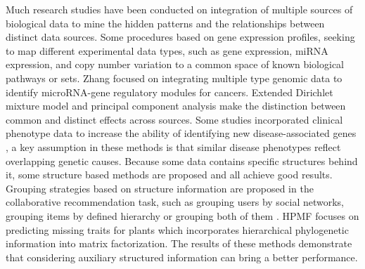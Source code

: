 \documentclass{bmcart}
\begin{document}
Much research studies have been conducted on integration of multiple sources of biological data to mine the hidden patterns and the relationships between distinct data sources. Some procedures based on gene expression profiles, seeking to map different experimental data types, such as gene expression, miRNA expression, and copy number variation to a common space of known biological pathways or sets\cite{Khatri2012,Mitrea2013}. Zhang\cite{Zhang2011} focused on integrating multiple type genomic data to identify microRNA-gene regulatory modules for cancers. Extended Dirichlet mixture model\cite{Lock2013} and principal component analysis\cite{Lock2013a} make the distinction between common and distinct effects across sources. Some studies incorporated clinical phenotype data to increase the ability of identifying new disease-associated genes\cite{Hwang2012,Lage2007,Li2010,Vanunu2010,Wu2008a,Wu2008b}
, a key assumption in these methods is that similar disease phenotypes reflect overlapping genetic causes\cite{Houle2010}.
 Because some data contains specific structures behind it, some structure based methods are proposed and all achieve good results. Grouping strategies based on structure information are proposed in the collaborative recommendation task, such as grouping users by social networks, grouping items by defined hierarchy or grouping both of them \cite{Wang2014,Ma2008,AliMashhoori2012}. HPMF\cite{Shan2012} focuses on predicting missing traits for plants which incorporates hierarchical phylogenetic information into matrix factorization. The results of these methods demonstrate that considering auxiliary structured information can bring a better performance.
\end{document}
